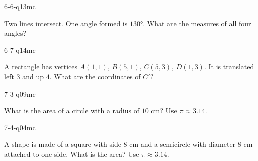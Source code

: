 \begin{practiceQuestion}{6-6-q13}{mc}
\begin{questionText}
Two lines intersect. One angle formed is $130°$. What are the measures of all four angles?
\end{questionText}
\end{practiceQuestion}

\begin{practiceQuestion}{6-7-q14}{mc}
\begin{questionText}
A rectangle has vertices $A(1, 1)$, $B(5, 1)$, $C(5, 3)$, $D(1, 3)$. It is translated left $3$ and up $4$. What are the coordinates of $C'$?
\end{questionText}
\end{practiceQuestion}

\begin{practiceQuestion}{7-3-q09}{mc}
\begin{questionText}
What is the area of a circle with a radius of $10$ cm? Use $\pi \approx 3.14$.
\end{questionText}
\end{practiceQuestion}

\begin{practiceQuestion}{7-4-q04}{mc}
\begin{questionText}
A shape is made of a square with side $8$ cm and a semicircle with diameter $8$ cm attached to one side. What is the area? Use $\pi \approx 3.14$.
\end{questionText}
\end{practiceQuestion}

